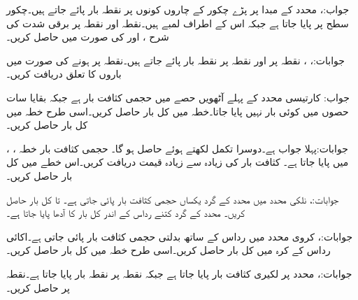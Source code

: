 جواب:، 
محدد کے مبدا پر پڑے چکور کے چاروں کونوں پر  نقطہ بار پائے جاتے ہیں۔چکور  سطح پر پایا جاتا ہے جبکہ اس کے اطراف  لمبے ہیں۔نقطہ  اور نقطہ  پر برقی شدت کی شرح ،  اور  کی صورت میں حاصل کریں۔

جوابات:، ، 
نقطہ  پر  اور نقطہ  پر  نقطہ بار پائے جاتے ہیں۔نقطہ  پر  ہونے کی صورت میں باروں کا تعلق دریافت کریں۔ 

جواب:
کارتیسی محدد کے پہلے آٹھویں حصے  میں حجمی کثافت بار  ہے جبکہ بقایا سات حصوں میں کوئی بار نہیں پایا جاتا۔خطہ  میں کل بار حاصل کریں۔اسی طرح خطہ  میں کل بار حاصل کریں۔

جوابات:پہلا جواب  ہے۔دوسرا تکمل  لکھتے ہوئے  حاصل ہو گا۔ 
حجمی کثافت بار  خطہ ، ،  میں پایا جاتا ہے۔ کثافت بار کی زیادہ سے زیادہ قیمت دریافت کریں۔اس خطے میں کل بار حاصل کریں۔

جوابات:، 
نلکی محدد میں  محدد کے گرد یکساں حجمی کثافت بار  پائی جاتی ہے۔ تا  کل بار حاصل کریں۔ محدد کے گرد کتنے رداس کے اندر کل بار کا آدھا پایا جاتا ہے۔

جوابات:،  
کروی محدد میں رداس کے ساتھ بدلتی حجمی کثافت بار  پائی جاتی ہے۔اکائی رداس کے کرہ میں کل بار حاصل کریں۔اسی طرح خطہ  میں کل بار حاصل کریں۔ 

جوابات:، 
 محدد پر  لکیری کثافت بار پایا جاتا ہے جبکہ نقطہ  پر  نقطہ بار پایا جاتا ہے۔نقطہ  پر  حاصل کریں۔

